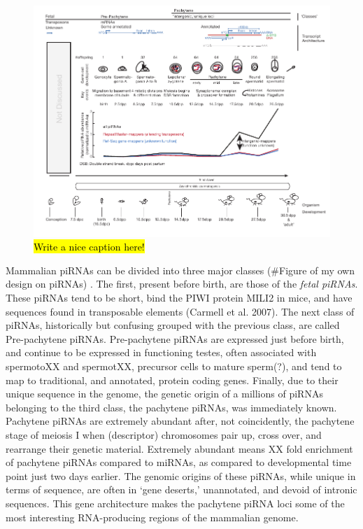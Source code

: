 \begin{figure}[htbp]
	\centering 
	\includegraphics{Figures/Chapter1/MammalianPiRNAClassesOverTime.pdf}
	\caption[Different Classes of mammalian piRNAs]
	{
		\hl{Write a nice caption here!}
	}
	\label{fig:Mammalian piRNA classes}
\end{figure}

Mammalian piRNAs can be divided into three major classes (\#Figure of my own design on piRNAs) \citep{Kuramochi-Miyagawa2008}. The first, present before birth, are those of the \textit{fetal piRNAs}. These piRNAs tend to be short, bind the PIWI protein MILI2 in mice, and have sequences found in transposable elements (Carmell et al. 2007). The next class of piRNAs, historically but confusing grouped with the previous class, are called Pre-pachytene piRNAs. Pre-pachytene piRNAs are expressed just before birth, and continue to be expressed in functioning testes, often associated with spermotoXX and spermotXX, precursor cells to mature sperm(?), and tend to map to traditional, and annotated, protein coding genes. Finally, due to their unique sequence in the genome, the genetic origin of a millions of piRNAs belonging to the third class, the pachytene piRNAs, was immediately known. Pachytene piRNAs are extremely abundant after, not coincidently, the pachytene stage of meiosis I when (descriptor) chromosomes pair up, cross over, and rearrange their genetic material. Extremely abundant means XX fold enrichment of pachytene piRNAs compared to miRNAs, as compared to developmental time point just two days earlier. The genomic origins of these piRNAs, while unique in terms of sequence, are often in ‘gene deserts,’ unannotated, and devoid of intronic sequences. This gene architecture makes the pachytene piRNA loci some of the most interesting RNA-producing regions of the mammalian genome.
 
